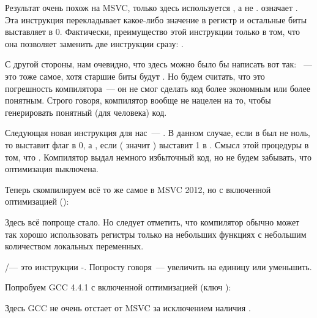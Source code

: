 \label{movzx}
Результат очень похож на MSVC, только здесь используется \MOVZX, а не \MOVSX. 
\MOVZX означает . Эта инструкция перекладывает какое-либо значение 
в регистр и остальные биты выставляет в 0.
Фактически, преимущество этой инструкции только в том, что она позволяет 
заменить две инструкции сразу: .

С другой стороны, нам очевидно, что здесь можно было бы написать вот так: 
~--- это тоже самое, хотя старшие биты \EAX будут . 
Но будем считать, что это погрешность компилятора~--- 
он не смог сделать код более экономным или более понятным. 
Строго говоря, компилятор вообще не нацелен на то, чтобы генерировать понятный (для человека) код.

Следующая новая инструкция для нас~--- \SETNZ. В данном случае, если в \AL был не ноль, 
то  выставит флаг \ZF в 0, а \SETNZ, если  
( значит ) выставит 1 в \AL. 
Смысл этой процедуры в том, что 
 .
Компилятор выдал немного избыточный код, но не будем забывать, что оптимизация выключена.

\label{strlen_MSVC_Ox}

Теперь скомпилируем всё то же самое в MSVC 2012, но с включенной оптимизацией (\Ox):



Здесь всё попроще стало. Но следует отметить, что компилятор обычно может так хорошо использовать регистры 
только на небольших функциях с небольшим количеством локальных переменных.

\INC/\DEC --- это инструкции -. Попросту говоря~--- 
увеличить на единицу или уменьшить.




Попробуем GCC 4.4.1 с включенной оптимизацией (ключ \Othree):



Здесь GCC не очень отстает от MSVC за исключением наличия \MOVZX. 

